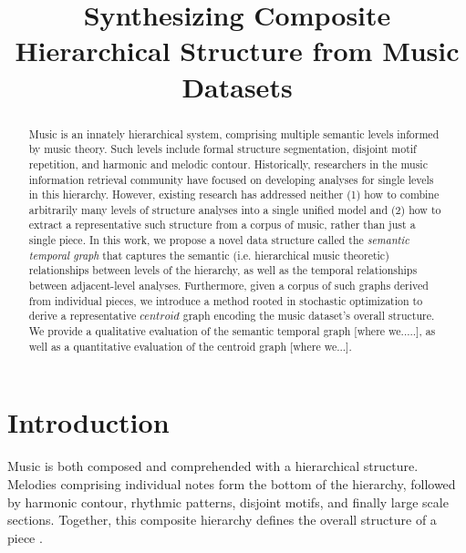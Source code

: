 \documentclass{article}
\title{Synthesizing Composite Hierarchical Structure from Music Datasets}
\begin{document}
%
\maketitle
%


\begin{abstract}
Music is an innately hierarchical system, comprising multiple semantic levels informed by music theory. Such levels include formal structure segmentation, disjoint motif repetition, and harmonic and melodic contour. Historically, researchers in the music information retrieval community have focused on developing analyses for single levels in this hierarchy. However, existing research has addressed neither (1) how to combine arbitrarily many levels of structure analyses into a single unified model and (2) how to extract a representative such structure from a corpus of music, rather than just a single piece. In this work, we propose a novel data structure called the \textit{semantic temporal graph} that captures the semantic (i.e. hierarchical music theoretic) relationships between levels of the hierarchy, as well as the temporal relationships between adjacent-level analyses. Furthermore, given a corpus of such graphs derived from individual pieces, we introduce a method rooted in stochastic optimization to derive a representative $centroid$ graph encoding the music dataset's overall structure. We provide a qualitative evaluation of the semantic temporal graph [where we.....], as well as a quantitative evaluation of the centroid graph [where we...].
\end{abstract}


%
\section{Introduction}\label{sec:intro}
Music is both composed and comprehended with a hierarchical structure. Melodies comprising individual notes form the bottom of the hierarchy, followed by harmonic contour, rhythmic patterns, disjoint motifs, and finally large scale sections. Together, this composite hierarchy defines the overall structure of a piece \cite{msaf}.
\end{document}
